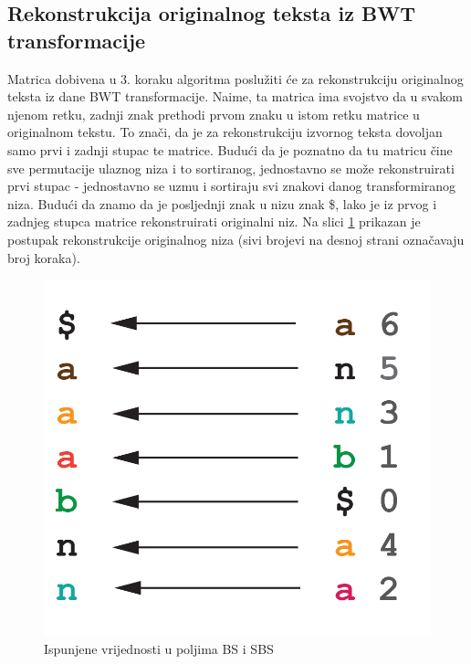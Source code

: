 \subsection{Rekonstrukcija originalnog teksta iz BWT transformacije}
Matrica dobivena u 3. koraku algoritma poslužiti će za rekonstrukciju originalnog teksta iz dane BWT transformacije. Naime, ta matrica ima svojstvo da u svakom njenom retku, zadnji znak prethodi prvom znaku u istom retku matrice u originalnom tekstu. To znači, da je za rekonstrukciju izvornog teksta dovoljan samo prvi i zadnji stupac te matrice. Budući da je poznatno da tu matricu čine sve permutacije ulaznog niza i to sortiranog, jednostavno se može rekonstruirati prvi stupac - jednostavno se uzmu i sortiraju svi znakovi danog transformiranog niza. Budući da znamo da je posljednji znak u nizu znak \$, lako je iz prvog i zadnjeg stupca matrice rekonstruirati originalni niz. Na slici \ref{bwt2} prikazan je postupak rekonstrukcije originalnog niza (sivi brojevi na desnoj strani označavaju broj koraka).

\begin{figure}[H]
\centering
\includegraphics[scale=0.2]{./pictures/reverseBWT.jpg}
\caption{Ispunjene vrijednosti u poljima BS i SBS}\label{bwt2}
\end{figure}
